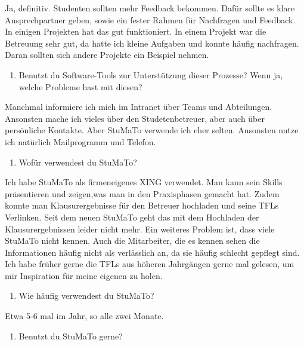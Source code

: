 \documentclass[
  12pt,
  ngerman,
  a4paper,
]{article}
\providecommand{\tightlist}{%
  \setlength{\itemsep}{0pt}\setlength{\parskip}{0pt}}
\begin{document}
Ja, definitiv. Studenten sollten mehr Feedback bekommen. Dafür sollte es
klare Ansprechpartner geben, sowie ein fester Rahmen für Nachfragen und
Feedback. In einigen Projekten hat das gut funktioniert. In einem
Projekt war die Betreuung sehr gut, da hatte ich kleine Aufgaben und
konnte häufig nachfragen. Daran sollten sich andere Projekte ein
Beispiel nehmen.

\begin{enumerate}
\def\labelenumi{\arabic{enumi}.}
\setcounter{enumi}{8}
\tightlist
\item
  Benutzt du Software-Tools zur Unterstützung dieser Prozesse? Wenn ja,
  welche Probleme hast mit diesen?
\end{enumerate}

Manchmal informiere ich mich im Intranet über Teams und Abteilungen.
Ansonsten mache ich vieles über den Studetenbetreuer, aber auch über
persönliche Kontakte. Aber StuMaTo verwende ich eher selten. Ansonsten
nutze ich natürlich Mailprogramm und Telefon.

\begin{enumerate}
\def\labelenumi{\arabic{enumi}.}
\setcounter{enumi}{9}
\tightlist
\item
  Wofür verwendest du StuMaTo?
\end{enumerate}

Ich habe StuMaTo als firmeneigenes XING verwendet. Man kann sein Skills
präsentieren und zeigen,was man in den Praxisphasen gemacht hat. Zudem
konnte man Klausurergebnisse für den Betreuer hochladen und seine TFLs
Verlinken. Seit dem neuen StuMaTo geht das mit dem Hochladen der
Klausurergebnissen leider nicht mehr. Ein weiteres Problem ist, dass
viele StuMaTo nicht kennen. Auch die Mitarbeiter, die es kennen sehen
die Informationen häufig nicht als verlässlich an, da sie häufig
schlecht gepflegt sind. Ich habe früher gerne die TFLs aus höheren
Jahrgängen gerne mal gelesen, um mir Inspiration für meine eigenen zu
holen.

\begin{enumerate}
\def\labelenumi{\arabic{enumi}.}
\setcounter{enumi}{10}
\tightlist
\item
  Wie häufig verwendest du StuMaTo?
\end{enumerate}

Etwa 5-6 mal im Jahr, so alle zwei Monate.

\begin{enumerate}
\def\labelenumi{\arabic{enumi}.}
\setcounter{enumi}{11}
\tightlist
\item
  Benutzt du StuMaTo gerne?
\end{enumerate}
\end{document}

